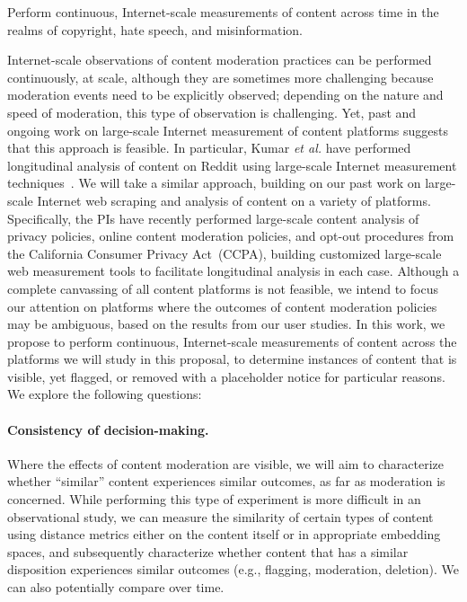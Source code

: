\begin{task}
    Perform continuous, Internet-scale measurements of content across time in
    the realms of copyright, hate speech, and misinformation.
\end{task}
\noindent
Internet-scale observations of content moderation practices can be performed
continuously, at scale, although they are sometimes more challenging because
moderation events need to be explicitly observed; depending on the nature and
speed of moderation, this type of observation is challenging.  
Yet, past and ongoing work on large-scale Internet measurement of content platforms
suggests that this approach is feasible. In particular, Kumar {\em et al.}
have performed longitudinal analysis of content on Reddit using large-scale
Internet measurement techniques~\cite{kumar2022understanding}. We will take a similar approach, building on
our past work on large-scale Internet web scraping and analysis of content on
a variety of platforms. Specifically, the PIs have recently performed
large-scale content analysis of privacy policies, online content moderation
policies, and opt-out procedures from the California Consumer Privacy
Act~(CCPA), building customized large-scale web measurement tools to
facilitate longitudinal analysis in each case. Although a complete canvassing
of all content platforms is not feasible, we intend to focus our attention on
platforms where the outcomes of content moderation policies may be ambiguous,
based on the results from our user studies.
In this work, we propose to perform continuous, Internet-scale measurements of
content across the platforms we will study in this proposal, to determine
instances of content that is visible, yet flagged, or removed with a
placeholder notice for particular reasons.  
We explore the following questions:

\paragraph{Consistency of decision-making.} Where the effects of content
moderation are visible, we will aim to characterize whether ``similar''
content experiences similar outcomes, as far as moderation is concerned. While
performing this type of experiment is more difficult in an observational
study, we can measure the similarity of certain types of content using
distance metrics either on the content itself or in appropriate embedding spaces, 
and subsequently characterize whether content that has a
similar disposition experiences similar outcomes (e.g., flagging, moderation,
deletion). We can also potentially compare over time.

